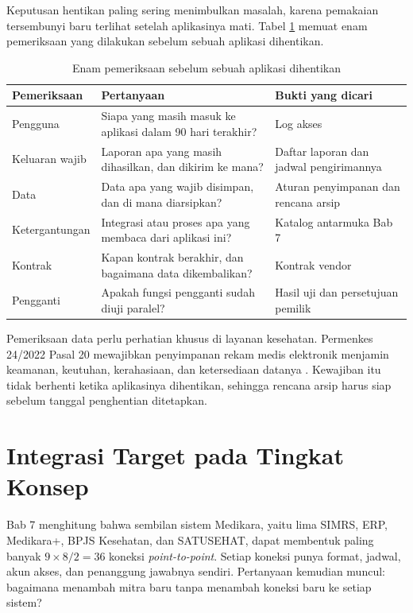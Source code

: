 Keputusan hentikan paling sering menimbulkan masalah, karena pemakaian
tersembunyi baru terlihat setelah aplikasinya mati. Tabel
\ref{tab:ch09-periksa-hentikan} memuat enam pemeriksaan yang dilakukan
sebelum sebuah aplikasi dihentikan.

\begin{table}[!htb]
  \centering
  \caption{Enam pemeriksaan sebelum sebuah aplikasi dihentikan}
  \label{tab:ch09-periksa-hentikan}
  \small
  \begin{tabularx}{\textwidth}{lXX}
    \hline
    \textbf{Pemeriksaan} & \textbf{Pertanyaan} & \textbf{Bukti yang dicari} \\
    \hline
    Pengguna & Siapa yang masih masuk ke aplikasi dalam 90 hari terakhir? & Log akses \\
    \hline
    Keluaran wajib & Laporan apa yang masih dihasilkan, dan dikirim ke mana? & Daftar laporan dan jadwal pengirimannya \\
    \hline
    Data & Data apa yang wajib disimpan, dan di mana diarsipkan? & Aturan penyimpanan dan rencana arsip \\
    \hline
    Ketergantungan & Integrasi atau proses apa yang membaca dari aplikasi ini? & Katalog antarmuka Bab 7 \\
    \hline
    Kontrak & Kapan kontrak berakhir, dan bagaimana data dikembalikan? & Kontrak vendor \\
    \hline
    Pengganti & Apakah fungsi pengganti sudah diuji paralel? & Hasil uji dan persetujuan pemilik \\
    \hline
  \end{tabularx}
\end{table}

Pemeriksaan data perlu perhatian khusus di layanan kesehatan. Permenkes
24/2022 Pasal 20 mewajibkan penyimpanan rekam medis elektronik menjamin
keamanan, keutuhan, kerahasiaan, dan ketersediaan datanya
\cite{permenkes24-2022}. Kewajiban itu tidak berhenti ketika aplikasinya
dihentikan, sehingga rencana arsip harus siap sebelum tanggal penghentian
ditetapkan.

\section{Integrasi Target pada Tingkat Konsep}

Bab 7 menghitung bahwa sembilan sistem Medikara, yaitu lima SIMRS, ERP,
Medikara+, BPJS Kesehatan, dan SATUSEHAT, dapat membentuk paling banyak
$9 \times 8 / 2 = 36$ koneksi \textit{point-to-point}. Setiap koneksi punya
format, jadwal, akun akses, dan penanggung jawabnya sendiri. Pertanyaan
kemudian muncul: bagaimana menambah mitra baru tanpa menambah koneksi baru ke
setiap sistem?

